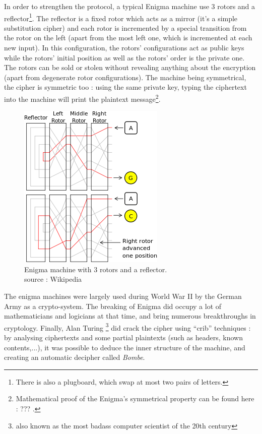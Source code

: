 In order to strengthen the protocol, a typical Enigma machine use 3 rotors and a reflector\footnote{There is also a plugboard, which swap at most two pairs of letters.}. The reflector is a fixed rotor which acts as a mirror (it's a simple substitution cipher) and each rotor is incremented by a special transition from the rotor on the left (apart from the most left one, which is incremented at each new input). In this configuration, the rotors' configurations act as public keys while the rotors' initial position as well as the rotors' order is the private one. The rotors can be sold or stolen without revealing anything about the encryption (apart from degenerate rotor configurations). The machine being symmetrical, the cipher is symmetric too : using the same private key, typing the ciphertext into the machine will print the plaintext message\footnote{Mathematical proof of the Enigma's symmetrical property can be found here : ??? .}.


\begin{figure}[ht!]
    \centering
        \includegraphics{images/Enigma_3rotors}
    \caption{ Enigma machine with 3 rotors and a reflector.\\ source : Wikipedia}
	\label{fig:enigma_3rotors}
\end{figure}

The enigma machines were largely used during World War II by the German Army as a crypto-system. The breaking of Enigma did occupy a lot of mathematicians and logicians at that time, and bring numerous breakthroughs in cryptology. Finally, Alan Turing \footnote{also known as the most badass computer scientist of the 20th century} did crack the cipher using ``crib'' techniques : by analysing ciphertexts and some partial plaintexts (such as headers, known contents,...), it was possible to deduce the inner structure of the machine, and creating an automatic decipher called \emph{Bombe}.






